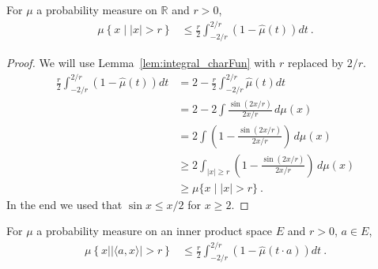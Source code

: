 


\begin{lemma}\label{lem:charFun_bound_large}
\leanok
{}
For $\mu$ a probability measure on $\mathbb{R}$ and $r > 0$,
\begin{align*}
\mu \left\{x \mid |x| > r\right\}
&\le \frac{r}{2} \int_{-2/r}^{2/r} (1 - \hat{\mu}(t))dt
\: .
\end{align*}
\end{lemma}

\begin{proof}
\leanok
We will use Lemma~\ref{lem:integral_charFun} with $r$ replaced by $2/r$.
\begin{align*}
    \frac{r}{2} \int_{-2/r}^{2/r} (1 - \hat{\mu}(t))dt
    &= 2 - \frac{r}{2} \int_{-2/r}^{2/r} \hat{\mu}(t)dt
    \\
    &= 2 - 2 \int \frac{\sin(2 x / r)}{2 x / r} \, d\mu(x)
    \\
    &= 2 \int \left(1 - \frac{\sin(2 x / r)}{2 x / r}\right) \, d\mu(x)
    \\
    &\ge 2 \int_{|x| \ge r} \left(1 - \frac{\sin(2 x / r)}{2 x / r}\right) \, d\mu(x)
    \\
    &\ge \mu\{x \mid |x| > r\}
    \: .
\end{align*}
In the end we used that $\sin x \le x /2$ for $x \ge 2$.
\end{proof}


\begin{lemma}\label{lem:charFun_bound_inner}
\leanok
{}
For $\mu$ a probability measure on an inner product space $E$ and $r > 0$, $a \in E$,
\begin{align*}
\mu \left\{x \mid \vert\langle a, x\rangle\vert > r\right\}
&\le \frac{r}{2} \int_{-2/r}^{2/r} (1 - \hat{\mu}(t \cdot a))dt
\: .
\end{align*}
\end{lemma}

